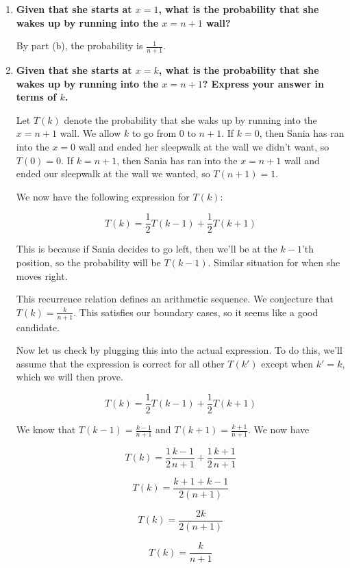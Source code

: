 \documentclass{article}
\begin{document}
\begin{enumerate}[label=(\alph*)]
    \item \textbf{Given that she starts at $x = 1$, what is the probability that she wakes up by running into the $x = n + 1$ wall?}
    
    By part (b), the probability is $\boxed{\frac{1}{n + 1}}$.

    \vspace{2cm}
    
    \item \textbf{Given that she starts at $x = k$, what is the probability that she wakes up by running into the $x = n + 1$? Express your answer in terms of $k$.}
    
    Let $T(k)$ denote the probability that she waks up by running into the $x = n + 1$ wall. We allow $k$ to go from $0$ to $n + 1$. If $k = 0$, then Sania has ran into the $x = 0$ wall and ended her sleepwalk at the wall we didn't want, so $T(0) = 0$. If $k = n + 1$, then Sania has ran into the $x = n + 1$ wall and ended our sleepwalk at the wall we wanted, so $T(n + 1) = 1$.

    We now have the following expression for $T(k)$:

    $$T(k) = \frac{1}{2} T(k - 1) + \frac{1}{2} T(k + 1)$$

    This is because if Sania decides to go left, then we'll be at the $k - 1$'th position, so the probability will be $T(k - 1)$. Similar situation for when she moves right.

    This recurrence relation defines an arithmetic sequence. We conjecture that $T(k) = \frac{k}{n + 1}$. This satisfies our boundary cases, so it seems like a good candidate.

    Now let us check by plugging this into the actual expression. To do this, we'll assume that the expression is correct for all other $T(k')$ except when $k' = k$, which we will then prove.

    $$T(k) = \frac{1}{2} T(k - 1) + \frac{1}{2} T(k + 1)$$

    We know that $T(k - 1) = \frac{k - 1}{n + 1}$ and $T(k + 1) = \frac{k + 1}{n + 1}$. We now have

    $$T(k) = \frac{1}{2} \frac{k - 1}{n + 1} + \frac{1}{2} \frac{k + 1}{n + 1}$$

    $$T(k) = \frac{k + 1 + k - 1}{2(n + 1)}$$

    $$T(k) = \frac{2k}{2(n + 1)}$$

    $$T(k) = \boxed{\frac{k}{n + 1}}$$


\end{enumerate}
\end{document}

